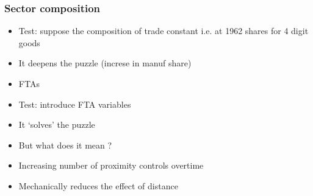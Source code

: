 \documentclass{beamer}
\begin{document}
\begin{frame}[plain]\frametitle{Sector composition}
\vspace{0.3cm}
\begin{itemize}
	\item Test: suppose the composition of trade constant i.e. at 1962 shares for 4 digit goods
	\item It deepens the puzzle (increse in manuf share)
\end{itemize}
\vspace{0.3cm}

\begin{itemize}
	\item FTAs
	\item Test: introduce FTA variables
	\item It `solves' the puzzle
	\item But what does it mean ? 
	\item Increasing number of proximity controls overtime 
	\item Mechanically reduces the effect of distance
\end{itemize}
\end{frame}
\end{document}
